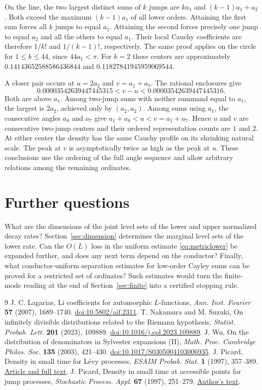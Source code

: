 \documentclass[11pt]{article}
\theoremstyle{remark}\newtheorem{remark}[theorem]{Remark}
\begin{document}
On the line, the two largest distinct sums of $k$ jumps are $k a_1$
and $(k-1)a_1+a_2$. Both exceed the maximum $(k-1)a_1$ of all lower
orders. Attaining the first sum forces all $k$ jumps to equal $a_1$.
Attaining the second forces precisely one jump to equal $a_2$ and
all the others to equal $a_1$. Their local Cauchy coefficients are
therefore $1/k!$ and $1/(k-1)!$, respectively. The same proof applies
on the circle for $1\leq k\leq44$, since $44a_1<\pi$.
For $k=2$ these centers are approximately $0.14143652588586436844$ and
$0.11827841945959069544$.

A closer pair occurs at $u=2a_2$ and $v=a_1+a_7$. The rational enclosures give
\[
 0.00003542639447445315<v-u<0.00003542639447445316.
\]
Both are above $a_1$. Among two-jump sums with neither summand equal to
$a_1$, the largest is $2a_2$, achieved only by $(a_2,a_2)$.
Among sums using $a_1$, the consecutive angles $a_8$ and $a_7$ give
$a_1+a_8<u<v=a_1+a_7$. Hence $u$ and $v$ are consecutive two-jump
centers and their ordered representation counts are $1$ and $2$.
At either center the density has the same Cauchy profile on its shrinking
natural scale. The peak at $v$ is asymptotically twice as high as the
peak at $u$. These conclusions use the ordering of the full angle
sequence and allow arbitrary relations among the remaining ordinates.
\section{Further questions}
What are the dimensions of the joint level sets of the lower and upper
normalized decay rates? Section~\ref{sec:dimension} determines the marginal
level sets of the lower rate. Can the $O(L)$ loss in the uniform estimate
\eqref{eq:metriclower} be expanded further, and does any next term depend
on the conductor? Finally, what conductor-uniform separation estimates
for low-order Cayley sums can be proved for a restricted set of ordinates?
Such estimates would turn the finite-mode reading at the end of
Section~\ref{sec:finite} into a certified stopping rule.
\begin{thebibliography}{9}
 J. C. Lagarias, Li coefficients for automorphic
$L$-functions, \emph{Ann. Inst. Fourier} \textbf{57} (2007), 1689--1740.
\href{https://doi.org/10.5802/aif.2311}{doi:10.5802/aif.2311}.
 T. Nakamura and M. Suzuki, On infinitely divisible distributions
related to the Riemann hypothesis, \emph{Statist. Probab. Lett.} \textbf{201}
(2023), 109889. \href{https://doi.org/10.1016/j.spl.2023.109889}{doi:10.1016/j.spl.2023.109889}.
 J. Wu, On the distribution of denominators in Sylvester
expansions (II), \emph{Math. Proc. Cambridge Philos. Soc.} \textbf{135}
(2003), 421--430. \href{https://doi.org/10.1017/S0305004103006935}{doi:10.1017/S0305004103006935}.
 J. Picard, Density in small time for L\'evy processes,
\emph{ESAIM Probab. Stat.} \textbf{1} (1997), 357--389.
\href{https://www.numdam.org/item/PS_1997__1__357_0/}{Article and full text}.
 J. Picard, Density in small time at accessible points
for jump processes, \emph{Stochastic Process. Appl.} \textbf{67} (1997),
251--279. \href{https://lmbp.uca.fr/~picard/small_time.pdf}{Author's text}.
\end{thebibliography}
\end{document}

